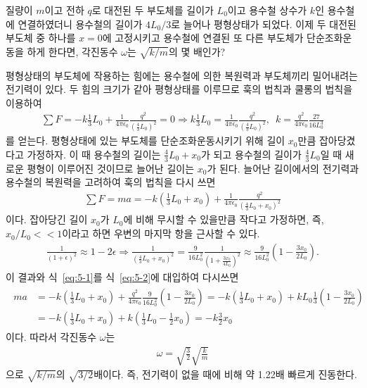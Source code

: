 \documentclass[floatfix,nofootinbib,superscriptaddress,fleqn,notitlepage]{revtex4-2}
\begin{document}
\vspace{1.cm}

질량이 $m$이고 전하 $q$로 대전된 두 부도체를 길이가 $L_0$이고 용수철
상수가 $k$인 용수철에 연결하였더니 용수철의 길이가 $4L_0/3$로 늘어나
평형상태가 되었다. 이제 두 대전된 부도체 중 하나를 $x=0$에 고정시키고
용수철에 연결된 또 다른 부도체가 단순조화운동을 하게 한다면, 각진동수
$\omega$는 $\sqrt{k/m}$의 몇 배인가? 
\vspace{1.cm}

평형상태의 부도체에 작용하는 힘에는 용수철에 의한 복원력과 부도체끼리 밀어내려는 전기력이 있다. 두 힘의 크기가
같아 평형상태를 이루므로 훅의 법칙과 쿨롱의 법칙을 이용하여
\begin{align}\label{eq:5-1}
  \sum F = -k\frac{1}{3}L_0+\frac{1}{4\pi\epsilon_0}
  \frac{q^2}{\left(\frac{4}{3}L_0\right)^2}=0\Longrightarrow
  k\frac{1}{3}L_0=\frac{1}{4\pi\epsilon_0}\frac{q^2}{\left(\frac{4}{3}L_0\right)^2},\,\,\,
  k=\frac{q^2}{4\pi\epsilon_0}\frac{27}{16L_0^3}
\end{align}
를 얻는다. 평형상태에 있는 부도체를 단순조화운동시키기 위해 길이 $x_0$만큼 잡아당겼다고 가정하자. 이 때
용수철의 길이는 $\frac{4}{3}L_0+x_0$가 되고 용수철의 길이가 $\frac{4}{3}L_0$일 때
새로운 평형이 이루어진 것이므로 늘어난 길이는 $x_0$가 된다. 늘어난 길이에서의 전기력과
용수철의 복원력을 고려하여 훅의 법칙을 다시 쓰면
\begin{align}\label{eq:5-2}
  \sum F = ma = -k\left(\frac{1}{3}L_0+x_0\right)+\frac{1}{4\pi\epsilon_0}\frac{q^2}
  {\left(\frac{4}{3}L_0+x_0\right)^2}
\end{align} 
이다. 잡아당긴 길이 $x_0$가 $L_0$에 비해 무시할 수 있을만큼 작다고
가정하면, 즉, $x_0/L_0<<1$이라고 하면 우변의 마지막 항을 근사할 수 있다.
\begin{align}\label{eq:5-3}
\frac{1}{(1+\epsilon)^2}\approx 1-2\epsilon\Longrightarrow
\frac{1}{\left(\frac{4}{3}L_0+x_0\right)^2}=\frac{9}{16L_0^2}
\frac{1}{\left(1+\frac{3x_0}{4L_0}\right)^2}\approx
\frac{9}{16L_0^2}\left(1-\frac{3x_0}{2L_0}\right).
\end{align}
이 결과와 식~\ref{eq:5-1}를 식~\ref{eq:5-2}에 대입하여 다시쓰면
\begin{align}
  \begin{split}
    ma&=-k\left(\frac{1}{3}L_0+x_0\right)+\frac{q^2}{4\pi\epsilon_0}
    \frac{9}{16L_0^2}\left(1-\frac{3x_0}{2L_0}\right)
    =-k\left(\frac{1}{3}L_0+x_0\right)+kL_0\frac{1}{3}\left(1-\frac{3x_0}{2L_0}\right)\\
    &=-k\left(\frac{1}{3}L_0+x_0\right)+k\left(\frac{1}{3}L_0-\frac{1}{2}x_0\right)
    =-k\frac{3}{2}x_0
  \end{split}
\end{align}
이다. 따라서 각진동수 $\omega$는
\begin{align}
  \omega=\sqrt{\frac{3}{2}}\sqrt{\frac{k}{m}}
\end{align}
으로 $\sqrt{k/m}$의 $\sqrt{3/2}$배이다. 즉, 전기력이 없을 때에 비해 약 1.22배 빠르게 진동한다.
\vspace{1.cm}
\end{document}
